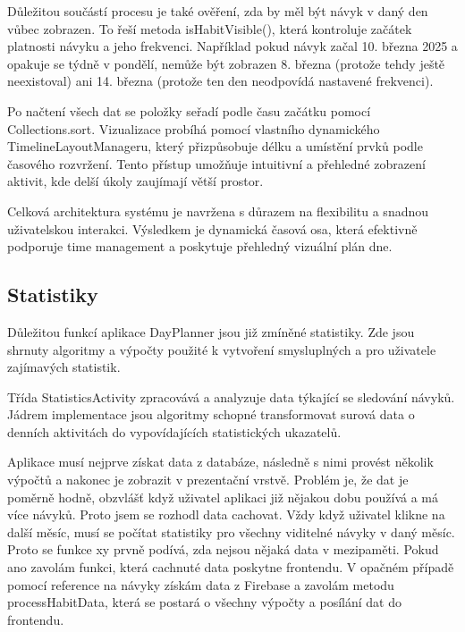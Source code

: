 Důležitou součástí procesu je také ověření, zda by měl být návyk v daný den vůbec zobrazen. To řeší metoda isHabitVisible(), která kontroluje začátek platnosti návyku a jeho frekvenci. Například pokud návyk začal 10. března 2025 a opakuje se týdně v pondělí, nemůže být zobrazen 8. března (protože tehdy ještě neexistoval) ani 14. března (protože ten den neodpovídá nastavené frekvenci).

Po načtení všech dat se položky seřadí podle času začátku pomocí Collections.sort. Vizualizace probíhá pomocí vlastního dynamického TimelineLayoutManageru, který přizpůsobuje délku a umístění prvků podle časového rozvržení. Tento přístup umožňuje intuitivní a přehledné zobrazení aktivit, kde delší úkoly zaujímají větší prostor.

Celková architektura systému je navržena s důrazem na flexibilitu a snadnou uživatelskou interakci. Výsledkem je dynamická časová osa, která efektivně podporuje time management a poskytuje přehledný vizuální plán dne.

\newpage

\subsection{Statistiky}
\hspace{14pt} Důležitou funkcí aplikace DayPlanner jsou již zmíněné statistiky. Zde jsou shrnuty algoritmy a výpočty použité k vytvoření smysluplných a pro uživatele zajímavých statistik.



Třída StatisticsActivity zpracovává a analyzuje data týkající se sledování návyků. Jádrem implementace jsou algoritmy schopné transformovat surová data o denních aktivitách do vypovídajících statistických ukazatelů.

Aplikace musí nejprve získat data z databáze, následně s nimi provést několik výpočtů a nakonec je zobrazit v prezentační vrstvě. Problém je, že dat je poměrně hodně, obzvlášť když uživatel aplikaci již nějakou dobu používá a má více návyků. Proto jsem se rozhodl data cachovat. Vždy když uživatel klikne na další měsíc, musí se počítat statistiky pro všechny viditelné návyky v daný měsíc. Proto se funkce xy prvně podívá, zda nejsou nějaká data v mezipaměti. Pokud ano zavolám funkci, která cachnuté data poskytne frontendu. V opačném případě pomocí reference na návyky získám data z Firebase a zavolám metodu processHabitData, která se postará o všechny výpočty a posílání dat do frontendu.


